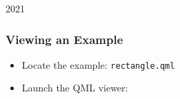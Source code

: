 
\begin{slide}[fragile]{2021}\frametitle{Viewing an Example}


\vspace*{1em}
\begin{itemize}
\item Locate the example: \texttt{rectangle.qml}
\item Launch the QML viewer:\\

%



\end{itemize}

\end{slide}


